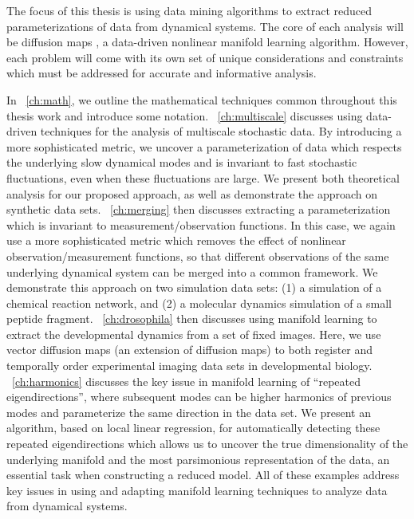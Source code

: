 The focus of this thesis is using data mining algorithms to extract reduced parameterizations of data from dynamical systems.
%
The core of each analysis will be diffusion maps \citep{Coifman2006}, a data-driven nonlinear manifold learning algorithm. 
%
However, each problem will come with its own set of unique considerations and constraints which must be addressed for accurate and informative analysis. 

In \chap~\ref{ch:math}, we outline the mathematical techniques common throughout this thesis work and introduce some notation. 
%
\chap~\ref{ch:multiscale} discusses using data-driven techniques for the analysis of multiscale stochastic data. 
%
By introducing a more sophisticated metric, we uncover a parameterization of data which respects the underlying slow dynamical modes and is invariant to fast stochastic fluctuations, even when these fluctuations are large. 
%
We present both theoretical analysis for our proposed approach, as well as demonstrate the approach on synthetic data sets. 
%
\chap~\ref{ch:merging} then discusses extracting a parameterization which is invariant to measurement/observation functions. 
%
In this case, we again use a more sophisticated metric which removes the effect of nonlinear observation/measurement functions, so that different observations of the same underlying dynamical system can be merged into a common framework. 
%
We demonstrate this approach on two simulation data sets: (1) a simulation of a chemical reaction network, and (2) a molecular dynamics simulation of a small peptide fragment.
%
\chap~\ref{ch:drosophila} then discusses using manifold learning to extract the developmental dynamics from a set of fixed images. 
%
Here, we use vector diffusion maps (an extension of diffusion maps) to both register and temporally order experimental imaging data sets in developmental biology. 
%
\chap~\ref{ch:harmonics} discusses the key issue in manifold learning of ``repeated eigendirections'', where subsequent modes can be higher harmonics of previous modes and parameterize the same direction in the data set. 
%
We present an algorithm, based on local linear regression, for automatically detecting these repeated eigendirections which allows us to uncover the true dimensionality of the underlying manifold and the most parsimonious representation of the data, an essential task when constructing a reduced model.
%
All of these examples address key issues in using and adapting manifold learning techniques to analyze data from dynamical systems.